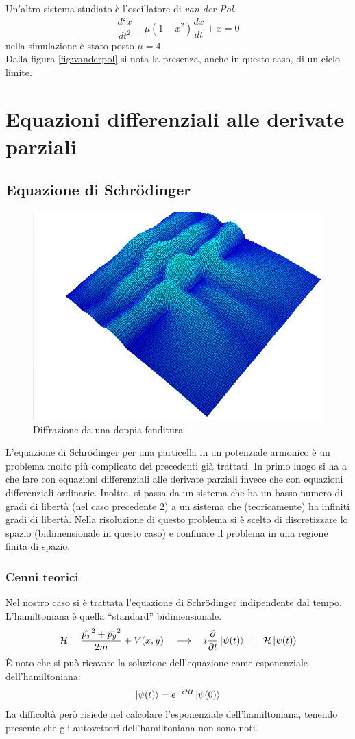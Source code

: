 Un'altro sistema studiato è l'oscillatore di \emph{van der Pol}.
$$
\frac{d^2x}{dt^2}-\mu(1-x^2)\frac{dx}{dt}+x = 0
$$
nella simulazione è stato posto $\mu = 4$.\\
Dalla figura \ref{fig:vanderpol} si nota la presenza, anche in questo caso, di un ciclo limite.
\chapter{Equazioni differenziali alle derivate parziali}
\section{Equazione di Schr\"{o}dinger}
\begin{figure}[H]
\centering
\includegraphics[width=0.6\columnwidth]{doppiafenditura.png}
\caption{\small{Diffrazione da una doppia fenditura}}
\end{figure}

L'equazione di Schr\"{o}dinger per una particella in un potenziale armonico è un problema molto più complicato dei precedenti già trattati.
In primo luogo si ha a che fare con equazioni differenziali alle derivate parziali invece che con equazioni differenziali ordinarie.
Inoltre, si passa da un sistema che ha un basso numero di gradi di libertà (nel caso precedente 2) a un sistema che (teoricamente) ha infiniti gradi di libertà.
Nella risoluzione di questo problema si è scelto di discretizzare lo spazio (bidimensionale in questo caso) e confinare il problema in una regione finita di spazio.
\subsection{Cenni teorici}
Nel nostro caso si è trattata l'equazione di Schr\"odinger indipendente dal tempo. L'hamiltoniana è quella ``standard'' bidimensionale.
$$
\mathcal{H} = \frac{\hat{p_x}^2+\hat{p_y}^2}{2m} + V(x,y) \quad \longrightarrow \quad i \p{}{t}\ket{\psi(t)} \ = \ \mathcal{H} \ket{\psi(t)}
$$
È noto che si può ricavare la soluzione dell'equazione come esponenziale dell'hamiltoniana:
$$
\left| \psi(t) \right> = e^{ -i \mathcal{H} t} \left| \psi(0) \right>
$$
La difficoltà però risiede nel calcolare l'esponenziale dell'hamiltoniana, tenendo presente che gli autovettori dell'hamiltoniana non sono noti.
